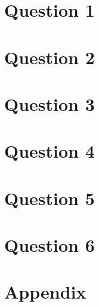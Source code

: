 \documentclass[12pt]{article}
\begin{document}
\section*{Question 1}


\section*{Question 2}


\section*{Question 3}


\section*{Question 4}


\section*{Question 5}


\section*{Question 6}


\section*{Appendix}
\end{document}
